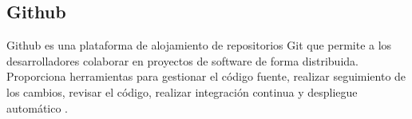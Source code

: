 

\subsection{Github}

Github es una plataforma de alojamiento de repositorios Git \cite{Git} que
permite a los desarrolladores colaborar en proyectos de software de forma
distribuida. Proporciona herramientas para gestionar el código fuente, realizar
seguimiento de los cambios, revisar el código, realizar integración continua y
despliegue automático \cite{Github}.

